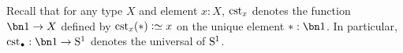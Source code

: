 

Recall that for any type $X$ and element $x:X$, $\cst x$ denotes the
function $\bn 1\to X$ defined by $\cst x (\ast) \defequi x$ on the
unique element $\ast: \bn 1$. In particular,
$\cst \base : \bn 1 \to \Sc$ denotes the universal \covering of ${\mathrm{S}^1}$.

